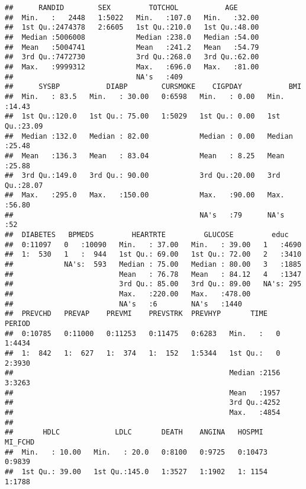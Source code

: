 \documentclass[]{article}
\begin{document}
\begin{verbatim}
##      RANDID        SEX         TOTCHOL           AGE       
##  Min.   :   2448   1:5022   Min.   :107.0   Min.   :32.00  
##  1st Qu.:2474378   2:6605   1st Qu.:210.0   1st Qu.:48.00  
##  Median :5006008            Median :238.0   Median :54.00  
##  Mean   :5004741            Mean   :241.2   Mean   :54.79  
##  3rd Qu.:7472730            3rd Qu.:268.0   3rd Qu.:62.00  
##  Max.   :9999312            Max.   :696.0   Max.   :81.00  
##                             NA's   :409                    
##      SYSBP           DIABP        CURSMOKE    CIGPDAY           BMI       
##  Min.   : 83.5   Min.   : 30.00   0:6598   Min.   : 0.00   Min.   :14.43  
##  1st Qu.:120.0   1st Qu.: 75.00   1:5029   1st Qu.: 0.00   1st Qu.:23.09  
##  Median :132.0   Median : 82.00            Median : 0.00   Median :25.48  
##  Mean   :136.3   Mean   : 83.04            Mean   : 8.25   Mean   :25.88  
##  3rd Qu.:149.0   3rd Qu.: 90.00            3rd Qu.:20.00   3rd Qu.:28.07  
##  Max.   :295.0   Max.   :150.00            Max.   :90.00   Max.   :56.80  
##                                            NA's   :79      NA's   :52     
##  DIABETES   BPMEDS         HEARTRTE         GLUCOSE         educ     
##  0:11097   0   :10090   Min.   : 37.00   Min.   : 39.00   1   :4690  
##  1:  530   1   :  944   1st Qu.: 69.00   1st Qu.: 72.00   2   :3410  
##            NA's:  593   Median : 75.00   Median : 80.00   3   :1885  
##                         Mean   : 76.78   Mean   : 84.12   4   :1347  
##                         3rd Qu.: 85.00   3rd Qu.: 89.00   NA's: 295  
##                         Max.   :220.00   Max.   :478.00              
##                         NA's   :6        NA's   :1440                
##  PREVCHD   PREVAP    PREVMI    PREVSTRK  PREVHYP       TIME      PERIOD  
##  0:10785   0:11000   0:11253   0:11475   0:6283   Min.   :   0   1:4434  
##  1:  842   1:  627   1:  374   1:  152   1:5344   1st Qu.:   0   2:3930  
##                                                   Median :2156   3:3263  
##                                                   Mean   :1957           
##                                                   3rd Qu.:4252           
##                                                   Max.   :4854           
##                                                                          
##       HDLC             LDLC       DEATH    ANGINA   HOSPMI    MI_FCHD 
##  Min.   : 10.00   Min.   : 20.0   0:8100   0:9725   0:10473   0:9839  
##  1st Qu.: 39.00   1st Qu.:145.0   1:3527   1:1902   1: 1154   1:1788  

\end{verbatim}
\end{document}
